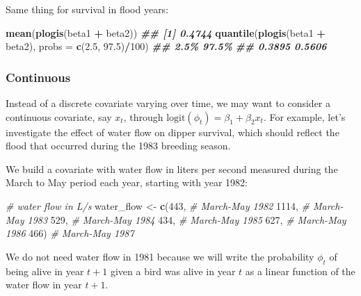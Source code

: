 \documentclass[
  12pt,
]{krantz}
\newenvironment{Shaded}{\begin{snugshade}}{\end{snugshade}}
\newcommand{\AttributeTok}[1]{\textcolor[rgb]{0.13,0.29,0.53}{#1}}
\newcommand{\CommentTok}[1]{\textcolor[rgb]{0.56,0.35,0.01}{\textit{#1}}}
\newcommand{\DecValTok}[1]{\textcolor[rgb]{0.00,0.00,0.81}{#1}}
\newcommand{\DocumentationTok}[1]{\textcolor[rgb]{0.56,0.35,0.01}{\textbf{\textit{#1}}}}
\newcommand{\FloatTok}[1]{\textcolor[rgb]{0.00,0.00,0.81}{#1}}
\newcommand{\FunctionTok}[1]{\textcolor[rgb]{0.13,0.29,0.53}{\textbf{#1}}}
\newcommand{\NormalTok}[1]{#1}
\newcommand{\OtherTok}[1]{\textcolor[rgb]{0.56,0.35,0.01}{#1}}
\newcommand{\SpecialCharTok}[1]{\textcolor[rgb]{0.81,0.36,0.00}{\textbf{#1}}}
\begin{document}
Same thing for survival in flood years:

\begin{Shaded}
\begin{Highlighting}[]
\FunctionTok{mean}\NormalTok{(}\FunctionTok{plogis}\NormalTok{(beta1 }\SpecialCharTok{+}\NormalTok{ beta2))}
\DocumentationTok{\#\# [1] 0.4744}
\FunctionTok{quantile}\NormalTok{(}\FunctionTok{plogis}\NormalTok{(beta1 }\SpecialCharTok{+}\NormalTok{ beta2), }\AttributeTok{probs =} \FunctionTok{c}\NormalTok{(}\FloatTok{2.5}\NormalTok{, }\FloatTok{97.5}\NormalTok{)}\SpecialCharTok{/}\DecValTok{100}\NormalTok{)}
\DocumentationTok{\#\#   2.5\%  97.5\% }
\DocumentationTok{\#\# 0.3895 0.5606}
\end{Highlighting}
\end{Shaded}

\subsubsection{Continuous}\label{continuous}

Instead of a discrete covariate varying over time, we may want to consider a continuous covariate, say \(x_t\), through \(\text{logit}(\phi_t) = \beta_1 + \beta_2 x_t\). For example, let's investigate the effect of water flow on dipper survival, which should reflect the flood that occurred during the 1983 breeding season.

We build a covariate with water flow in liters per second measured during the March to May period each year, starting with year 1982:

\begin{Shaded}
\begin{Highlighting}[]
\CommentTok{\# water flow in L/s}
\NormalTok{water\_flow }\OtherTok{\textless{}{-}} \FunctionTok{c}\NormalTok{(}\DecValTok{443}\NormalTok{,  }\CommentTok{\# March{-}May 1982}
                \DecValTok{1114}\NormalTok{, }\CommentTok{\# March{-}May 1983}
                \DecValTok{529}\NormalTok{,  }\CommentTok{\# March{-}May 1984}
                \DecValTok{434}\NormalTok{,  }\CommentTok{\# March{-}May 1985}
                \DecValTok{627}\NormalTok{,  }\CommentTok{\# March{-}May 1986}
                \DecValTok{466}\NormalTok{)  }\CommentTok{\# March{-}May 1987}
\end{Highlighting}
\end{Shaded}

We do not need water flow in 1981 because we will write the probability \(\phi_t\) of being alive in year \(t + 1\) given a bird was alive in year \(t\) as a linear function of the water flow in year \(t + 1\).
\end{document}
